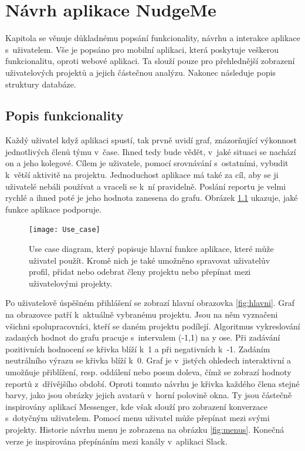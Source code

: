 \chapter{Návrh aplikace NudgeMe}

Kapitola se věnuje důkladnému popsání funkcionality, návrhu a interakce aplikace s~uživatelem. Vše je popsáno pro mobilní aplikaci, která poskytuje veškerou funkcionalitu, oproti webové aplikaci. Ta slouží pouze pro přehlednější zobrazení uživatelových projektů a jejich částečnou analýzu. Nakonec následuje popis struktury databáze.

\section{Popis funkcionality}

Každý uživatel když aplikaci spustí, tak prvně uvidí graf, znázorňující výkonnost jednotlivých členů týmu v~čase. Ihned tedy bude vědět, v~jaké situaci se nachází on a jeho kolegové. Cílem je uživatele, pomocí srovnávání s~ostatními, vybudit k~větší aktivitě na projektu. Jednoduchost aplikace má také za cíl, aby se ji uživatelé nebáli používat a vraceli se k~ní pravidelně. Poslání reportu je velmi rychlé a ihned poté je jeho hodnota zanesena do grafu. Obrázek \ref{use_case} ukazuje, jaké funkce aplikace podporuje.  

\begin{figure}[H]
\centering
\texttt{[image: Use\_case]}
\caption{Use case diagram, který popisuje hlavní funkce aplikace, které může uživatel použít. Kromě nich je také umožněno spravovat uživatelův profil, přidat nebo odebrat členy projektu nebo přepínat mezi uživatelovými projekty. }
\label{use_case}
\end{figure}
 
Po uživatelově úspěšném přihlášení se zobrazí hlavní obrazovka \ref{fig:hlavni}. Graf na obrazovce patří k~aktuálně vybranému projektu. Jsou na něm vyznačeni všichni spolupracovníci, kteří se daném projektu podílejí. Algoritmus vykreslování zadaných hodnot do grafu pracuje s~intervalem (-1,1) na y ose. Při zadávání pozitivních hodnocení se křivka blíží k~1 a při negativních k~-1. Zadáním neutrálního výrazu se křivka blíží k~0. Graf je v~jistých ohledech interaktivní a umožňuje přiblížení, resp. oddálení nebo posun doleva, čímž se zobrazí hodnoty reportů z~dřívějšího období. Oproti tomuto návrhu je křivka každého člena stejné barvy, jako jsou obrázky jejich avatarů v~horní polovině okna. Ty jsou částečně inspirovány aplikací Messenger, kde však slouží pro zobrazení konverzace s~dotyčným uživatelem. Pomocí menu uživatel může přepínat mezi svými projekty. Historie návrhu menu je zobrazena na obrázku \ref{fig:menus}. Konečná verze je inspirována přepínáním mezi kanály v~aplikaci Slack. 

